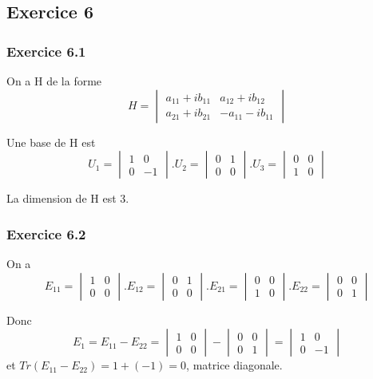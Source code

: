 \documentclass[]{book}
\theoremstyle{definition}
\begin{document}
\subsection*{Exercice 6}
\subsubsection*{Exercice 6.1}
On a H de la forme
$$
H = \begin{vmatrix} a_{11} + ib_{11} & a_{12} + ib_{12} \\ a_{21} + ib_{21} & -a_{11} - ib_{11} \end{vmatrix}
$$

Une base de H est 
$$U_1 = \begin{vmatrix} 1 & 0 \\ 0 & -1 \end{vmatrix} . U_2 = \begin{vmatrix} 0 & 1 \\ 0 & 0 \end{vmatrix} . U_3 = \begin{vmatrix} 0 & 0 \\ 1 & 0 \end{vmatrix}$$

La dimension de H est 3.

\subsubsection*{Exercice 6.2}
On a 
$$E_{11} = \begin{vmatrix} 1 & 0 \\ 0 & 0 \end{vmatrix} . E_{12} = \begin{vmatrix} 0 & 1 \\ 0 & 0 \end{vmatrix} . E_{21} = \begin{vmatrix} 0 & 0 \\ 1 & 0 \end{vmatrix}. E_{22} = \begin{vmatrix} 0 & 0 \\ 0 & 1 \end{vmatrix}$$

Donc
$$
E_1 = E_{11}-E_{22} = \begin{vmatrix} 1 & 0 \\ 0 & 0 \end{vmatrix} - \begin{vmatrix} 0 & 0 \\ 0 & 1 \end{vmatrix} =  \begin{vmatrix} 1 & 0 \\ 0 & -1 \end{vmatrix}
$$
et $Tr(E_{11}-E_{22}) = 1 + (-1) = 0$, matrice diagonale.
\end{document}

